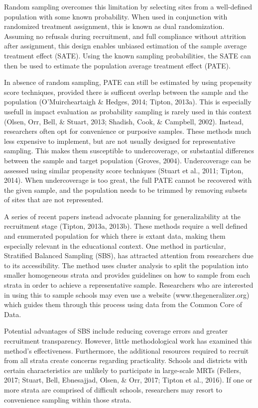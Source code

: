 \documentclass[man,floatsintext]{apa6}
\theoremstyle{definition}
\theoremstyle{definition}
\theoremstyle{definition}
\theoremstyle{remark}
\begin{document}
Random sampling overcomes this limitation by selecting sites from a
well-defined population with some known probability. When used in
conjunction with randomized treatment assignment, this is known as dual
randomization. Assuming no refusals during recruitment, and full
compliance without attrition after assignment, this design enables
unbiased estimation of the sample average treatment effect (SATE). Using
the known sampling probabilities, the SATE can then be used to estimate
the population average treatment effect (PATE).

In absence of random sampling, PATE can still be estimated by using
propensity score techniques, provided there is sufficent overlap between
the sample and the population (O'Muircheartaigh \& Hedges, 2014; Tipton,
2013a). This is especially usefull in impact evaluation as probability
sampling is rarely used in this context (Olsen, Orr, Bell, \& Stuart,
2013; Shadish, Cook, \& Campbell, 2002). Instead, researchers often opt
for convenience or purposive samples. These methods much less expensive
to implement, but are not usually designed for representative sampling.
This makes them susceptible to undercoverage, or substantial differencs
between the sample and target population (Groves, 2004). Undercoverage
can be assessed using similar propensity score techniques (Stuart et
al., 2011; Tipton, 2014). When undercoverage is too great, the full PATE
cannot be recovered with the given sample, and the population needs to
be trimmed by removing subsets of sites that are not represented.

A series of recent papers instead advocate planning for generalizability
at the recruitment stage (Tipton, 2013a, 2013b). These methods require a
well defined and enumerated population for which there is extant data,
making them especially relevant in the educational context. One method
in particular, Stratified Balanced Sampling (SBS), has attracted
attention from researchers due to its accessibility. The method uses
cluster analysis to split the population into smaller homogeneous strata
and provides guidelines on how to sample from each strata in order to
achieve a representative sample. Researchers who are interested in using
this to sample schools may even use a website (www.thegeneralizer.org)
which guides them through this process using data from the Common Core
of Data.

Potential advantages of SBS include reducing coverage errors and greater
recruitment transparency. However, little methodological work has
examined this method's effectiveness. Furthermore, the additional
resources required to recruit from all strata create concerns regarding
practicality. Schools and districts with certain characteristics are
unlikely to participate in large-scale MRTs (Fellers, 2017; Stuart,
Bell, Ebnesajjad, Olsen, \& Orr, 2017; Tipton et al., 2016). If one or
more strata are comprised of difficult schools, researchers may resort
to convenience sampling within those strata.
\end{document}
